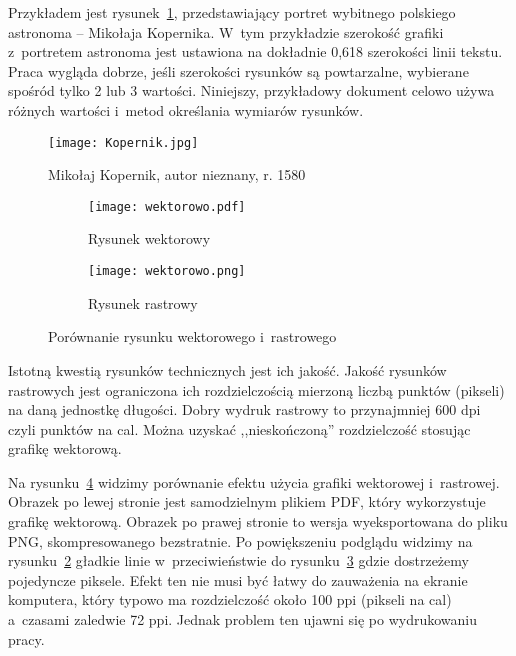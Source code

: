 Przykładem jest rysunek~\ref{rys:kopernik}, przedstawiający portret wybitnego polskiego astronoma -- Mikołaja Kopernika. W~tym przykładzie szerokość grafiki z~portretem astronoma jest ustawiona na dokładnie 0,618 szerokości linii tekstu. Praca wygląda dobrze, jeśli szerokości rysunków są powtarzalne, wybierane spośród tylko 2 lub 3 wartości. Niniejszy, przykładowy dokument celowo używa różnych wartości i~metod określania wymiarów rysunków.

\begin{figure}[!hb]
	\centering \texttt{[image: Kopernik.jpg]} %
	\caption{Mikołaj Kopernik, autor nieznany, r. 1580}
	\label{rys:kopernik}
\end{figure}

\begin{figure}
\centering
\begin{subfigure}{.5\textwidth}
  \centering
  \texttt{[image: wektorowo.pdf]} %
  \caption{Rysunek wektorowy}
  \label{rys:wektorowopdf}
\end{subfigure}%
\begin{subfigure}{.5\textwidth}
  \centering
  \texttt{[image: wektorowo.png]}
  \caption{Rysunek rastrowy}
  \label{rys:wektorowopng}
\end{subfigure}
\caption{Porównanie rysunku wektorowego i~rastrowego}
\label{rys:wektorowo}
\end{figure}

Istotną kwestią rysunków technicznych jest ich jakość. Jakość rysunków rastrowych jest ograniczona ich rozdzielczością mierzoną liczbą punktów (pikseli) na daną jednostkę długości. Dobry wydruk rastrowy to przynajmniej 600 dpi czyli punktów na cal. Można uzyskać ,,nieskończoną'' rozdzielczość stosując grafikę wektorową.

Na rysunku~\ref{rys:wektorowo} widzimy porównanie efektu użycia grafiki wektorowej i~rastrowej. Obrazek po lewej stronie jest samodzielnym plikiem PDF, który wykorzystuje grafikę wektorową. Obrazek po prawej stronie to wersja wyeksportowana do pliku PNG, skompresowanego bezstratnie. Po powiększeniu podglądu widzimy na rysunku~\ref{rys:wektorowopdf} gładkie linie w~przeciwieństwie do rysunku~\ref{rys:wektorowopng} gdzie dostrzeżemy pojedyncze piksele. Efekt ten nie musi być łatwy do zauważenia na ekranie komputera, który typowo ma rozdzielczość około 100 ppi (pikseli na cal) a~czasami zaledwie 72 ppi. Jednak problem ten ujawni się po wydrukowaniu pracy.

